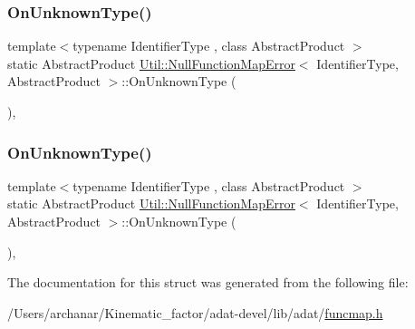 \mbox{\label{structUtil_1_1NullFunctionMapError_afde570791232ed1469bcba0fdffcd8c8}} 
\subsubsection{\texorpdfstring{OnUnknownType()}{OnUnknownType()}\hspace{0.1cm}{\footnotesize\ttfamily [2/3]}}
{\footnotesize\ttfamily template$<$typename Identifier\+Type , class Abstract\+Product $>$ \\
static Abstract\+Product \mbox{\hyperlink{structUtil_1_1NullFunctionMapError}{Util\+::\+Null\+Function\+Map\+Error}}$<$ Identifier\+Type, Abstract\+Product $>$\+::On\+Unknown\+Type (\begin{DoxyParamCaption}\item[{const Identifier\+Type \&}]{ }\end{DoxyParamCaption})\hspace{0.3cm}{\ttfamily [inline]}, {\ttfamily [static]}}

\mbox{\label{structUtil_1_1NullFunctionMapError_afde570791232ed1469bcba0fdffcd8c8}} 
\subsubsection{\texorpdfstring{OnUnknownType()}{OnUnknownType()}\hspace{0.1cm}{\footnotesize\ttfamily [3/3]}}
{\footnotesize\ttfamily template$<$typename Identifier\+Type , class Abstract\+Product $>$ \\
static Abstract\+Product \mbox{\hyperlink{structUtil_1_1NullFunctionMapError}{Util\+::\+Null\+Function\+Map\+Error}}$<$ Identifier\+Type, Abstract\+Product $>$\+::On\+Unknown\+Type (\begin{DoxyParamCaption}\item[{const Identifier\+Type \&}]{ }\end{DoxyParamCaption})\hspace{0.3cm}{\ttfamily [inline]}, {\ttfamily [static]}}



The documentation for this struct was generated from the following file\+:\begin{DoxyCompactItemize}
\item 
/\+Users/archanar/\+Kinematic\+\_\+factor/adat-\/devel/lib/adat/\mbox{\hyperlink{adat-devel_2lib_2adat_2funcmap_8h}{funcmap.\+h}}\end{DoxyCompactItemize}
